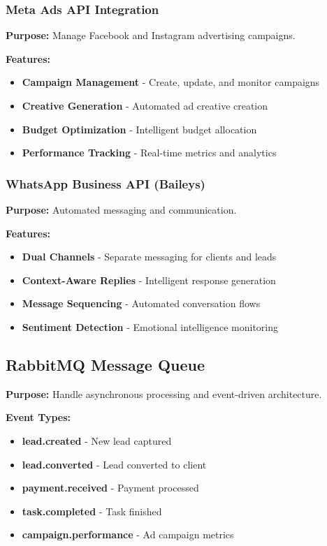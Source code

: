 \documentclass[12pt,a4paper]{article}
\begin{document}
\subsubsection{Meta Ads API Integration}
\textbf{Purpose:} Manage Facebook and Instagram advertising campaigns.

\textbf{Features:}
\begin{itemize}
    \item \textbf{Campaign Management} - Create, update, and monitor campaigns
    \item \textbf{Creative Generation} - Automated ad creative creation
    \item \textbf{Budget Optimization} - Intelligent budget allocation
    \item \textbf{Performance Tracking} - Real-time metrics and analytics
\end{itemize}

\subsubsection{WhatsApp Business API (Baileys)}
\textbf{Purpose:} Automated messaging and communication.

\textbf{Features:}
\begin{itemize}
    \item \textbf{Dual Channels} - Separate messaging for clients and leads
    \item \textbf{Context-Aware Replies} - Intelligent response generation
    \item \textbf{Message Sequencing} - Automated conversation flows
    \item \textbf{Sentiment Detection} - Emotional intelligence monitoring
\end{itemize}

\subsection{RabbitMQ Message Queue}
\textbf{Purpose:} Handle asynchronous processing and event-driven architecture.

\textbf{Event Types:}
\begin{itemize}
    \item \textbf{lead.created} - New lead captured
    \item \textbf{lead.converted} - Lead converted to client
    \item \textbf{payment.received} - Payment processed
    \item \textbf{task.completed} - Task finished
    \item \textbf{campaign.performance} - Ad campaign metrics
\end{itemize}
\end{document}
